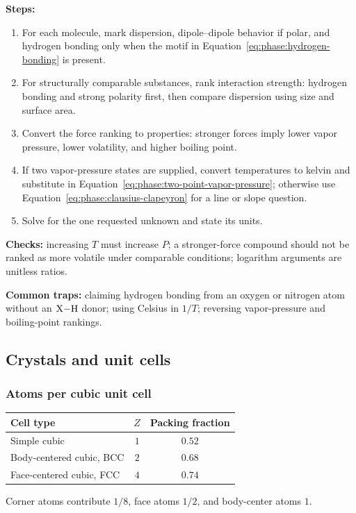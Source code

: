 \textbf{Steps:}
\begin{enumerate}
    \item For each molecule, mark dispersion, dipole--dipole behavior if polar, and hydrogen bonding only when the motif in Equation~\ref{eq:phase:hydrogen-bonding} is present.
    \item For structurally comparable substances, rank interaction strength: hydrogen bonding and strong polarity first, then compare dispersion using size and surface area.
    \item Convert the force ranking to properties: stronger forces imply lower vapor pressure, lower volatility, and higher boiling point.
    \item If two vapor-pressure states are supplied, convert temperatures to kelvin and substitute in Equation~\ref{eq:phase:two-point-vapor-pressure}; otherwise use Equation~\ref{eq:phase:clausius-clapeyron} for a line or slope question.
    \item Solve for the one requested unknown and state its units.
\end{enumerate}

\textbf{Checks:} increasing \(T\) must increase \(P\); a stronger-force compound should not be ranked as more volatile under comparable conditions; logarithm arguments are unitless ratios.

\textbf{Common traps:} claiming hydrogen bonding from an oxygen or nitrogen atom without an \(\ce{X-H}\) donor; using Celsius in \(1/T\); reversing vapor-pressure and boiling-point rankings.

\subsection{Crystals and unit cells}

\subsubsection{Atoms per cubic unit cell}
\begin{tabular}{@{}lcc@{}}
\toprule
Cell type & \(Z\) & Packing fraction\\
\midrule
Simple cubic & \(1\) & \(0.52\)\\
Body-centered cubic, BCC & \(2\) & \(0.68\)\\
Face-centered cubic, FCC & \(4\) & \(0.74\)\\
\bottomrule
\end{tabular}
Corner atoms contribute \(1/8\), face atoms \(1/2\), and body-center atoms \(1\).

